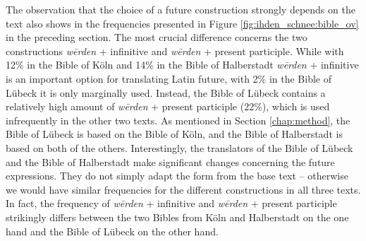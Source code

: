 \documentclass[output=paper,colorlinks,citecolor=brown]{langscibook}
\begin{document}
The observation that the choice of a future construction strongly depends on the text also shows in the frequencies presented in Figure \ref{fig:ihden_schnee:bible_ov} in the preceding section.  
The most crucial difference concerns the two constructions \textit{wērden} + infinitive and \textit{wērden} + present participle. While with 12\% in the Bible of Köln and 14\% in the Bible of Halberstadt \textit{wērden} + infinitive is an important option for translating Latin future, with 2\% in the Bible of Lübeck it is only marginally used. Instead, the Bible of Lübeck contains a relatively high amount of \textit{wērden} + present participle (22\%), which is used infrequently in the other two texts. As mentioned in Section \ref{chap:method}, the Bible of Lübeck is based on the Bible of Köln, and the Bible of Halberstadt is based on both of the others. Interestingly, the translators of the Bible of Lübeck and the Bible of Halberstadt make significant changes concerning the future expressions. They do not simply adapt the form from the base text – otherwise we would have similar frequencies for the different constructions in all three texts. In fact, the frequency of \textit{wērden} + infinitive and \textit{wērden} + present participle strikingly differs between the two Bibles from Köln and Halberstadt on the one hand and the Bible of Lübeck on the other hand.

\largerpage[-0.5]
\end{document}
